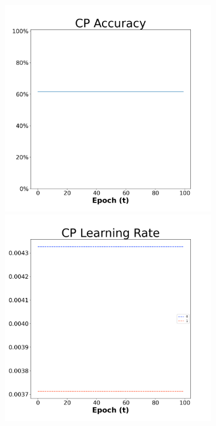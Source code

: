\begin{figure}[H]
    \centering %
\begin{subfigure}{0.3\textwidth}
  \includegraphics[width=\linewidth]{images/exper1/SP/CP_0.01_acc.png}
    \includegraphics[width=\linewidth]{images/exper1/SP/CP_0.01_lr.png}

\end{subfigure}
\end{figure}
